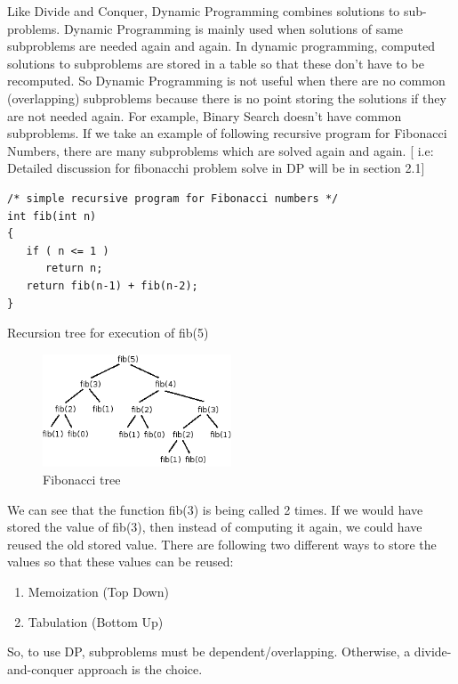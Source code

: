\documentclass[12pt]{article}
\begin{document}
\par{\indent Like Divide and Conquer, Dynamic Programming combines solutions to sub-problems. Dynamic Programming is mainly used when solutions of same subproblems are needed again and again. In dynamic programming, computed solutions to subproblems are stored in a table so that these don’t have to be recomputed. So Dynamic Programming is not useful when there are no common (overlapping) subproblems because there is no point storing the solutions if they are not needed again. For example, Binary Search doesn’t have common subproblems. If we take an example of following recursive program for Fibonacci Numbers, there are many subproblems which are solved again and again. [ i.e: Detailed discussion for fibonacchi problem solve in DP will be in section 2.1]
\newline
\begin{lstlisting}
/* simple recursive program for Fibonacci numbers */
int fib(int n) 
{ 
   if ( n <= 1 ) 
      return n; 
   return fib(n-1) + fib(n-2); 
}
\end{lstlisting}
Recursion tree for execution of fib(5)
\begin{figure}[h!]
\centering
\includegraphics[width=0.5\textwidth]{fib5.png}
\caption{Fibonacci tree}
\end{figure}
We can see that the function fib(3) is being called 2 times. If we would have stored the value of fib(3), then instead of computing it again, we could have reused the old stored value. There are following two different ways to store the values so that these values can be reused:
\begin{enumerate}[label=(\alph*)]
\item Memoization (Top Down)
\item Tabulation (Bottom Up)
\end{enumerate}
So, to use DP, subproblems must be dependent/overlapping. Otherwise, a divide-and-conquer approach is the choice.

}
\end{document}
